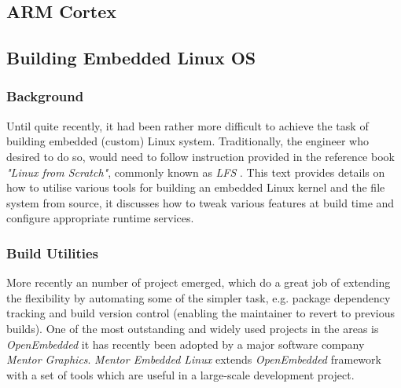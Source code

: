 \subsection{ARM Cortex}




\subsection{Building Embedded Linux OS}


\subsubsection{Background}

  Until quite recently, it had been rather more difficult to achieve
 the task of building embedded (custom) Linux system. Traditionally,
 the engineer who desired to do so, would need to follow instruction
 provided in the reference book \emph{"Linux from Scratch"}, commonly
 known as \emph{LFS} \cite{book:lfs}. This text provides details on
 how to utilise various tools for building an embedded Linux kernel
 and the file system from source, it discusses how to tweak various
 features at build time and configure appropriate runtime services.

\subsubsection{Build Utilities}
 
  More recently an number of project emerged, which do a
 great job of extending the flexibility by automating some of the
 simpler task, e.g. package dependency tracking and build version
 control (enabling the maintainer to revert to previous builds).
 One of the most outstanding and widely used projects in the areas
 is \emph{OpenEmbedded} \cite{links:oe} it has recently been adopted
 by a major software company \emph{Mentor Graphics}. \emph{Mentor
 Embedded Linux} extends \emph{OpenEmbedded} framework with a set
 of tools which are useful in a large-scale development project.
 
